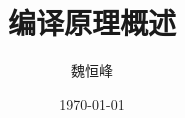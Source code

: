 \documentclass[]{beamer}
\title[]{编译原理概述}
\author[魏恒峰]{\large 魏恒峰}
\institute{hfwei@nju.edu.cn}
\date{\today}
\begin{document}
\maketitle



\thankyou{}

\end{document}

